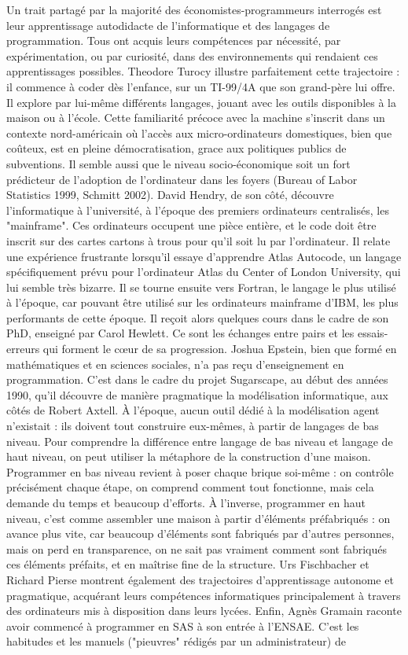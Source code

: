 Un trait partagé par la majorité des économistes-programmeurs interrogés est leur apprentissage autodidacte de l’informatique et des langages de programmation. Tous ont acquis leurs compétences par nécessité, par expérimentation, ou par curiosité, dans des environnements qui rendaient ces apprentissages possibles. Theodore Turocy illustre parfaitement cette trajectoire : il commence à coder dès l’enfance, sur un TI-99/4A que son grand-père lui offre. Il explore par lui-même différents langages, jouant avec les outils disponibles à la maison ou à l’école. Cette familiarité précoce avec la machine s’inscrit dans un contexte nord-américain où l’accès aux micro-ordinateurs domestiques, bien que coûteux, est en pleine démocratisation, grace aux politiques publics de subventions. Il semble aussi que le niveau socio-économique soit un fort prédicteur de l'adoption de l'ordinateur dans les foyers (Bureau of Labor Statistics 1999\cite{ComputerOwnershipSharply}, Schmitt 2002\cite{schmittGivePCsChange2002}). David Hendry, de son côté, découvre l’informatique à l’université, à l’époque des premiers ordinateurs centralisés, les "mainframe". Ces ordinateurs occupent une pièce entière, et le code doit être inscrit sur des cartes cartons à trous pour qu'il soit lu par l'ordinateur. Il relate une expérience frustrante lorsqu'il essaye d'apprendre Atlas Autocode, un langage spécifiquement prévu pour l'ordinateur Atlas du Center of London University, qui lui semble très bizarre. Il se tourne ensuite vers Fortran, le langage le plus utilisé à l'époque, car pouvant être utilisé sur les ordinateurs mainframe d'IBM, les plus performants de cette époque. Il reçoit alors quelques cours dans le cadre de son PhD, enseigné par Carol Hewlett. Ce sont les échanges entre pairs et les essais-erreurs qui forment le cœur de sa progression. Joshua Epstein, bien que formé en mathématiques et en sciences sociales, n’a pas reçu d’enseignement en programmation. C’est dans le cadre du projet Sugarscape, au début des années 1990, qu’il découvre de manière pragmatique la modélisation informatique, aux côtés de Robert Axtell. À l’époque, aucun outil dédié à la modélisation agent n’existait : ils doivent tout construire eux-mêmes, à partir de langages de bas niveau.  Pour comprendre la différence entre langage de bas niveau et langage de haut niveau, on peut utiliser la métaphore de la construction d’une maison. Programmer en bas niveau revient à poser chaque brique soi-même : on contrôle précisément chaque étape, on comprend comment tout fonctionne, mais cela demande du temps et beaucoup d’efforts. À l’inverse, programmer en haut niveau, c’est comme assembler une maison à partir d’éléments préfabriqués : on avance plus vite, car beaucoup d'éléments sont fabriqués par d'autres personnes, mais on perd en transparence, on ne sait pas vraiment comment sont fabriqués ces éléments préfaits, et en maîtrise fine de la structure. Urs Fischbacher et Richard Pierse montrent également des trajectoires d’apprentissage autonome et pragmatique, acquérant leurs compétences informatiques principalement à travers des ordinateurs mis à disposition dans leurs lycées. Enfin, Agnès Gramain raconte avoir commencé à programmer en SAS à son entrée à l’ENSAE. C’est les habitudes et les manuels ("pieuvres" rédigés par un administrateur) de 